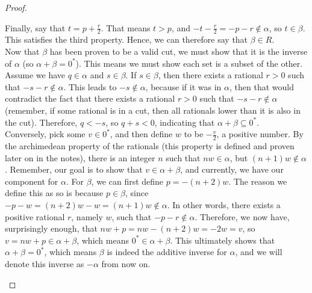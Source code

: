 \documentclass{article}
\theoremstyle{definition}
\begin{document}
\begin{section}
\begin{proof}
\begin{enumerate}
\begin{enumerate}
Finally,  say that $t = p + \frac{r}{2}$. That means $t > p$, and $-t - \frac{r}{2} = -p-r \not\in\alpha$, so $t\in\beta$. This satisfies the third property. Hence, we can therefore say that $\beta\in R$. \\
Now that $\beta$ has been proven to be a valid cut, we must show that it is the inverse of $\alpha$ (so $\alpha + \beta = 0^*$). This means we must show each set is a subset of the other. \\
Assume we have $q\in\alpha$ and $s\in\beta$. If $s\in\beta$, then there exists a rational $r > 0$ such that $-s - r \not\in\alpha$. This leads to $-s \not\in\alpha$, because if it was in $\alpha$, then that would contradict the fact that there exists a rational $r > 0$ such that $-s - r \not\in\alpha$ (remember, if some rational is in a cut, then all rationals lower than it is also in the cut). Therefore, $q < -s$, so $q + s < 0$, indicating that $\alpha + \beta \subseteq 0^*$. \\
Conversely, pick some $v \in 0^*$, and then define $w$ to be $-\frac{v}{2}$, a positive number. By the archimedean property of the rationals (this property is defined and proven later on in the notes), there is an integer $n$ such that $nw \in\alpha$, but $(n+1)w \not\in\alpha$. Remember, our goal is to show that $v \in \alpha + \beta$, and currently, we have our component for $\alpha$. For $\beta$, we can first define $p = -(n+2)w$. The reason we define this as so is because $p\in\beta$, since $-p-w = (n+2)w - w = (n+1)w \not\in\alpha$. In other words, there exists a positive rational $r$, namely $w$, such that $-p-r \not\in\alpha$. Therefore, we now have, surprisingly enough, that $nw+p = nw - (n+2)w = -2w = v$, so $v = nw + p \in \alpha + \beta$, which means $0^* \in \alpha + \beta$. This ultimately shows that $\alpha + \beta = 0^*$, which means $\beta$ is indeed the additive inverse for $\alpha$, and we will denote this inverse as $-\alpha$ from now on.
\end{enumerate}
\end{enumerate}
\end{proof}
\end{section}

 
 
 
\end{document}
